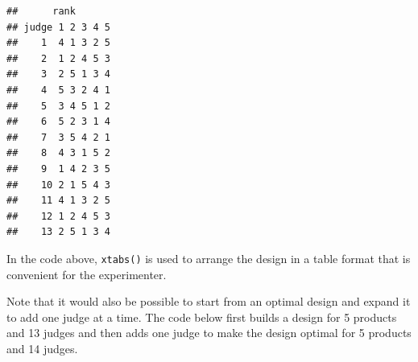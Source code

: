 \documentclass[
]{krantz}
\makeatletter
\newenvironment{Shaded}{\begin{snugshade}}{\end{snugshade}}
\newcommand{\AttributeTok}[1]{\textcolor[rgb]{0.61,0.61,0.61}{#1}}
\newcommand{\ConstantTok}[1]{\textcolor[rgb]{0,0,0}{#1}}
\newcommand{\DecValTok}[1]{\textcolor[rgb]{0.06,0.06,0.06}{#1}}
\newcommand{\FunctionTok}[1]{\textcolor[rgb]{0,0,0}{#1}}
\newcommand{\NormalTok}[1]{#1}
\newcommand{\OtherTok}[1]{\textcolor[rgb]{0.37,0.37,0.37}{#1}}
\newcommand{\SpecialCharTok}[1]{\textcolor[rgb]{0,0,0}{#1}}
\newenvironment{kframe}{%
\medskip{}
\setlength{\fboxsep}{.8em}
 \def\at@end@of@kframe{}%
 \ifinner\ifhmode%
  \def\at@end@of@kframe{\end{minipage}}%
  \begin{minipage}{\columnwidth}%
 \fi\fi%
 \def\FrameCommand##1{\hskip\@totalleftmargin \hskip-\fboxsep
 \colorbox{shadecolor}{##1}\hskip-\fboxsep
     \hskip-\linewidth \hskip-\@totalleftmargin \hskip\columnwidth}%
 \MakeFramed {\advance\hsize-\width
   \@totalleftmargin\z@ \linewidth\hsize
   \@setminipage}}%
 {\par\unskip\endMakeFramed%
 \at@end@of@kframe}
\renewenvironment{Shaded}{\begin{kframe}}{\end{kframe}}
\makeatother
\begin{document}
\begin{Shaded}
\end{Shaded}

\begin{verbatim}
##      rank
## judge 1 2 3 4 5
##    1  4 1 3 2 5
##    2  1 2 4 5 3
##    3  2 5 1 3 4
##    4  5 3 2 4 1
##    5  3 4 5 1 2
##    6  5 2 3 1 4
##    7  3 5 4 2 1
##    8  4 3 1 5 2
##    9  1 4 2 3 5
##    10 2 1 5 4 3
##    11 4 1 3 2 5
##    12 1 2 4 5 3
##    13 2 5 1 3 4
\end{verbatim}

In the code above, \texttt{xtabs()} is used to arrange the design in a table format that is convenient for the experimenter.

Note that it would also be possible to start from an optimal design and expand it to add one judge at a time. The code below first builds a design for 5 products and 13 judges and then adds one judge to make the design optimal for 5 products and 14 judges.
\end{document}

